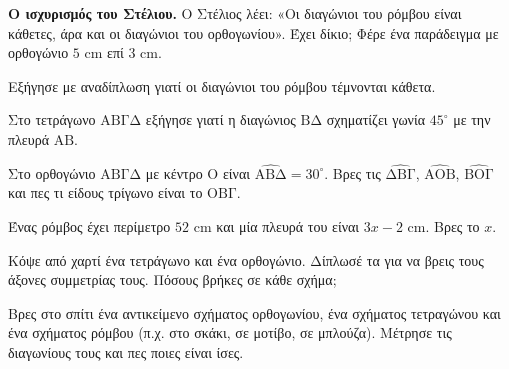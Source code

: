 \ex \textbf{Ο ισχυρισμός του Στέλιου.} Ο Στέλιος λέει: «Οι διαγώνιοι του ρόμβου είναι κάθετες, άρα και οι διαγώνιοι του ορθογωνίου». Έχει δίκιο; Φέρε ένα παράδειγμα με ορθογώνιο $5$ cm επί $3$ cm.


\ex Εξήγησε με αναδίπλωση γιατί οι διαγώνιοι του ρόμβου τέμνονται κάθετα.

\ex Στο τετράγωνο $\mathrm{ΑΒΓΔ}$ εξήγησε γιατί η διαγώνιος $\mathrm{ΒΔ}$ σχηματίζει γωνία $45^\circ$ με την πλευρά $\mathrm{ΑΒ}$.

\ex Στο ορθογώνιο $\mathrm{ΑΒΓΔ}$ με κέντρο $\mathrm{Ο}$ είναι $\widehat{\mathrm{ΑΒΔ}}=30^\circ$. Βρες τις $\widehat{\mathrm{ΔΒΓ}}$, $\widehat{\mathrm{ΑΟΒ}}$, $\widehat{\mathrm{ΒΟΓ}}$ και πες τι είδους τρίγωνο είναι το $\mathrm{ΟΒΓ}$.

\ex Ένας ρόμβος έχει περίμετρο $52$ cm και μία πλευρά του είναι $3x-2$ cm. Βρες το $x$.


\ex Κόψε από χαρτί ένα τετράγωνο και ένα ορθογώνιο. Δίπλωσέ τα για να βρεις τους άξονες συμμετρίας τους. Πόσους βρήκες σε κάθε σχήμα;

\ex Βρες στο σπίτι ένα αντικείμενο σχήματος ορθογωνίου, ένα σχήματος τετραγώνου και ένα σχήματος ρόμβου (π.χ. στο σκάκι, σε μοτίβο, σε μπλούζα). Μέτρησε τις διαγωνίους τους και πες ποιες είναι ίσες.
